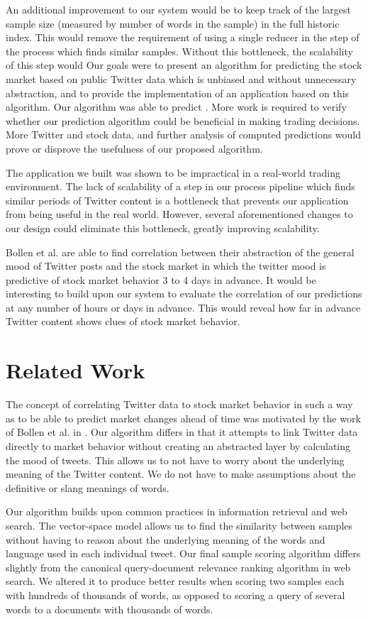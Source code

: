 \documentclass[twocolumn]{article}
\begin{document}
An additional improvement to our system would be to keep track of the largest sample size (measured by number of words in the sample) in the full historic index. This would remove the requirement of using a single reducer in the step of the process which finds similar samples. Without this bottleneck, the scalability of this step would Our goals were to present an algorithm for predicting the stock market based on public Twitter data which is unbiased and without unnecessary abstraction, and to provide the implementation of an application based on this algorithm. Our algorithm was able to predict . More work is required to verify whether our prediction algorithm could be beneficial in making trading decisions. More Twitter and stock data, and further analysis of computed predictions would prove or disprove the usefulness of our proposed algorithm.

The application we built was shown to be impractical in a real-world trading environment. The lack of scalability of a step in our process pipeline which finds similar periods of Twitter content is a bottleneck that prevents our application from being useful in the real world. However, several aforementioned changes to our design could eliminate this bottleneck, greatly improving scalability.

Bollen et al. are able to find correlation between their abstraction of the general mood of Twitter posts and the stock market in which the twitter mood is predictive of stock market behavior 3 to 4 days in advance. It would be interesting to build upon our system to evaluate the correlation of our predictions at any number of hours or days in advance. This would reveal how far in advance Twitter content shows clues of stock market behavior.

\section{Related Work}
The concept of correlating Twitter data to stock market behavior in such a way as to be able to predict market changes ahead of time was motivated by the work of Bollen et al. in \cite{bollen}. Our algorithm differs in that it attempts to link Twitter data directly to market behavior without creating an abstracted layer by calculating the mood of tweets. This allows us to not have to worry about the underlying meaning of the Twitter content. We do not have to make assumptions about the definitive or slang meanings of words.

Our algorithm builds upon common practices in information retrieval and web search. The vector-space model allows us to find the similarity between samples without having to reason about the underlying meaning of the words and language used in each individual tweet. Our final sample scoring algorithm differs slightly from the canonical query-document relevance ranking algorithm in web search. We altered it to produce better results when scoring two samples each with hundreds of thousands of words, as opposed to scoring a query of several words to a documents with thousands of words.
\end{document}
